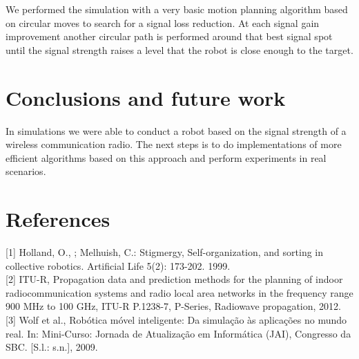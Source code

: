 \documentclass[11pt,a4paper,oneside,twocolumn]{article}
\begin{document}
We performed the simulation with a very basic motion planning algorithm based on
circular moves to search for a signal loss reduction. At each signal gain
improvement another circular path is performed around that best signal spot until
the signal strength raises a level that the robot is close enough to the
target.

\section{Conclusions and future work}

In simulations we were able to conduct a robot based on the signal strength of a
wireless communication radio. The next steps is to do implementations of more
efficient algorithms based on this approach and perform experiments in real
scenarios.

\section{References}

[1] Holland, O., ; Melhuish, C.: Stigmergy, Self-organization, and sorting in
collective robotics. Artificial Life 5(2): 173-202. 1999.
\\
{} [2] ITU-R, Propagation data and prediction methods for the planning of
indoor radiocommunication systems and radio local area networks in the frequency
range 900 MHz to 100 GHz, ITU-R P.1238-7, P-Series, Radiowave propagation, 2012.
\\
{} [3] Wolf et al., Rob\'otica m\'ovel inteligente: Da simula\c{c}\~ao 
\`as aplica\c{c}\~oes no mundo real. In: Mini-Curso: Jornada de Atualiza\c{c}\~ao 
em Inform\'atica (JAI), Congresso da SBC. [S.l.: s.n.], 2009.
\end{document}
